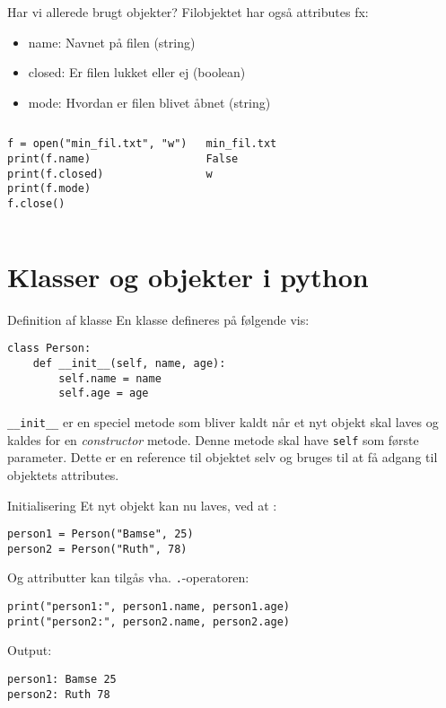 \documentclass[main.tex]{subfiles}
\begin{document}
\begin{frame}[fragile]{Har vi allerede brugt objekter?}
		Filobjektet har også attributes fx:
	\begin{itemize}
		\item name: Navnet på filen (string)
		\item closed: Er filen lukket eller ej (boolean)
		\item mode: Hvordan er filen blivet åbnet (string)
	\end{itemize}
	\begin{columns}
		\begin{lstlisting}[style=python]
f = open("min_fil.txt", "w")
print(f.name)
print(f.closed)
print(f.mode)
f.close()
		\end{lstlisting}
		\begin{lstlisting}[style=python]
min_fil.txt
False
w
		\end{lstlisting}
	\end{columns}
\end{frame}

\section{Klasser og objekter i python}


\begin{frame}[fragile]{Definition af klasse}
	En klasse defineres på følgende vis:
		\begin{lstlisting}[style=python]
class Person:
	def __init__(self, name, age):
		self.name = name
		self.age = age
	\end{lstlisting}
	\texttt{\_\_init\_\_} er en speciel metode som bliver kaldt når et nyt objekt skal laves og kaldes for en \textit{constructor} metode. Denne metode skal have \texttt{self} som første parameter. Dette er en reference til objektet selv og bruges til at få adgang til objektets attributes.
\end{frame}

\begin{frame}[fragile]{Initialisering}
	Et nyt objekt kan nu laves, ved at :
		\begin{lstlisting}[style=python]
person1 = Person("Bamse", 25)
person2 = Person("Ruth", 78)
	\end{lstlisting}
	Og attributter kan tilgås vha. \texttt{.}-operatoren:
	\begin{lstlisting}[style=python]
print("person1:", person1.name, person1.age)
print("person2:", person2.name, person2.age)
	\end{lstlisting}
	Output:
	\begin{lstlisting}[style=python]
person1: Bamse 25
person2: Ruth 78
	\end{lstlisting}
\end{frame}
\end{document}
